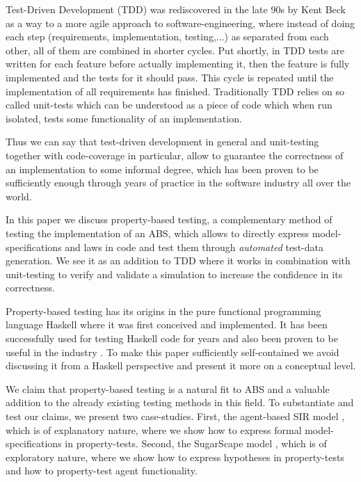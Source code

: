 Test-Driven Development (TDD) was rediscovered in the late 90s by Kent Beck \cite{beck_test_2002} as a way to a more agile approach to software-engineering, where instead of doing each step (requirements, implementation, testing,...) as separated from each other, all of them are combined in shorter cycles. Put shortly, in TDD tests are written for each feature before actually implementing it, then the feature is fully implemented and the tests for it should pass. This cycle is repeated until the implementation of all requirements has finished. Traditionally TDD relies on so called unit-tests which can be understood as a piece of code which when run isolated, tests some functionality of an implementation.

Thus we can say that test-driven development in general and unit-testing together with code-coverage in particular, allow to guarantee the correctness of an implementation to some informal degree, which has been proven to be sufficiently enough through years of practice in the software industry all over the world. 

In this paper we discuss property-based testing, a complementary method of testing the implementation of an ABS, which allows to directly express model-specifications and laws in code and test them through \textit{automated} test-data generation. We see it as an addition to TDD where it works in combination with unit-testing to verify and validate a simulation to increase the confidence in its correctness. 

Property-based testing has its origins \cite{claessen_quickcheck_2000,claessen_testing_2002,runciman_smallcheck_2008} in the pure functional programming language Haskell \cite{hudak_history_2007} where it was first conceived and implemented. It has been successfully used for testing Haskell code for years and also been proven to be useful in the industry \cite{hughes_quickcheck_2007}. To make this paper sufficiently self-contained we avoid discussing it from a Haskell perspective and present it more on a conceptual level. 

We claim that property-based testing is a natural fit to ABS and a valuable addition to the already existing testing methods in this field. To substantiate and test our claims, we present two case-studies. First, the agent-based SIR model \cite{macal_agent-based_2010}, which is of explanatory nature, where we show how to express formal model-specifications in property-tests. Second, the SugarScape model \cite{epstein_growing_1996}, which is of exploratory nature, where we show how to express hypotheses in property-tests and how to property-test agent functionality. 

